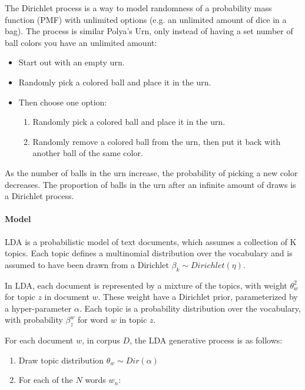 \documentclass[12pt]{report}
\begin{document}
The Dirichlet process is a way to model randomness of a probability mass
function (PMF) with unlimited options (e.g. an unlimited amount of dice in a
bag). The process is similar Polya’s Urn, only instead of having a set number
of ball colors you have an unlimited amount:

\begin{itemize}
\item Start out with an empty urn.
\item Randomly pick a colored ball and place it in the urn.
\item Then choose one option:
\begin{enumerate}
\item Randomly pick a colored ball and place it in the urn.
\item Randomly remove a colored ball from the urn, then put it back with another 
ball of the same color.
\end{enumerate}
\end{itemize}
 
As the number of balls in the urn increase, the probability of picking a new
color decreases. The proportion of balls in the urn after an infinite amount of
draws is a Dirichlet process.


\paragraph{Model}

LDA is a probabilistic model of text documents, which assumes a collection of 
K topics. Each topic defines a multinomial distribution over the vocabulary 
and is assumed to have been drawn from a Dirichlet 
$\beta_k \sim Dirichlet(\eta)$. 

In LDA, each document is represented by a mixture of the topics, with weight
$\theta_w^2$ for topic $z$ in document $w$. These weight have a Dirichlet prior,
parameterized by a hyper-parameter $\alpha$. Each topic is a probability
distribution over the vocabulary, with probability $\beta^w_z$ for word $w$ in
topic $z$.
 
For each document $w$, in corpus $D$, the LDA generative process is as follows:

\begin{enumerate}
	\item Draw topic distribution $\theta_w \sim Dir(\alpha)$
	\item For each of the $N$ words $w_n$:
\end{enumerate}
\end{document}
